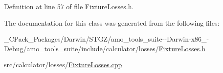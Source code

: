 Definition at line 57 of file Fixture\+Losses.\+h.



The documentation for this class was generated from the following files\+:\begin{DoxyCompactItemize}
\item 
\+\_\+\+C\+Pack\+\_\+\+Packages/\+Darwin/\+S\+T\+G\+Z/amo\+\_\+tools\+\_\+suite-\/-\/\+Darwin-\/x86\+\_-\/\+Debug/amo\+\_\+tools\+\_\+suite/include/calculator/losses/\hyperlink{___c_pack___packages_2_darwin_2_s_t_g_z_2amo__tools__suite--_darwin-x86__64-_debug_2amo__tools__6f7ae12a348f2f4e7be063f73b33ce11}{Fixture\+Losses.\+h}\item 
src/calculator/losses/\hyperlink{_fixture_losses_8cpp}{Fixture\+Losses.\+cpp}\end{DoxyCompactItemize}
